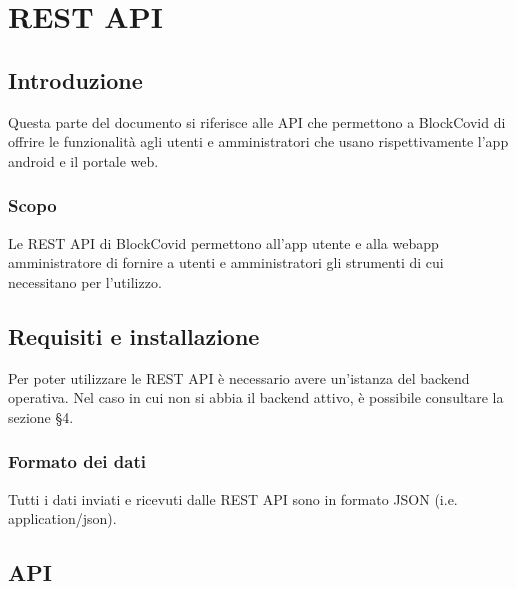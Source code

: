 \section{REST API}
\subsection{Introduzione}
Questa parte del documento si riferisce alle API che permettono a BlockCovid di offrire le funzionalità agli utenti e amministratori che usano rispettivamente l'app android e il portale web.

\subsubsection{Scopo}
Le REST API di BlockCovid permettono all'app utente e alla webapp amministratore di fornire a utenti e amministratori gli strumenti di cui necessitano per l'utilizzo.

\subsection{Requisiti e installazione}
Per poter utilizzare le REST API è necessario avere un'istanza del backend operativa. Nel caso in cui non si abbia il backend attivo, è possibile consultare la sezione §4.

\subsubsection{Formato dei dati}
Tutti i dati inviati e ricevuti dalle REST API sono in formato JSON (i.e. application/json).

\subsection{API}
